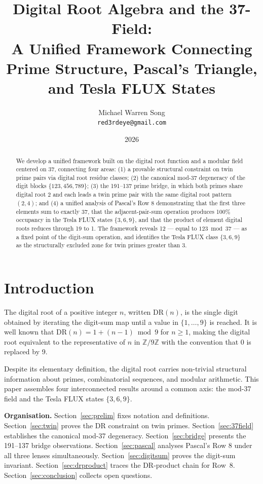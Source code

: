\documentclass[12pt]{article}
\title{Digital Root Algebra and the 37-Field:\\
A Unified Framework Connecting\\
Prime Structure, Pascal's Triangle, and Tesla FLUX States}
\author{Michael Warren Song\\
\small\texttt{red3rdeye@gmail.com}}
\date{2026}
\begin{document}
\maketitle

\begin{abstract}
We develop a unified framework built on the digital root function and a modular
field centered on 37, connecting four areas: (1) a provable structural constraint
on twin prime pairs via digital root residue classes; (2) the canonical mod-37
degeneracy of the digit blocks $\{123, 456, 789\}$; (3) the 191--137 prime bridge,
in which both primes share digital root 2 and each leads a twin prime pair with
the same digital root pattern $(2,4)$; and (4) a unified analysis of Pascal's
Row 8 demonstrating that the first three elements sum to exactly 37, that the
adjacent-pair-sum operation produces 100\% occupancy in the Tesla FLUX states
$\{3,6,9\}$, and that the product of element digital roots reduces through 19
to 1.  The framework reveals 12 --- equal to $123 \bmod 37$ --- as a fixed
point of the digit-sum operation, and identifies the Tesla FLUX class $\{3,6,9\}$
as the structurally excluded zone for twin primes greater than 3.
\end{abstract}

\tableofcontents
\newpage

\section{Introduction}
\label{sec:intro}

The digital root of a positive integer $n$, written $\mathrm{DR}(n)$, is the
single digit obtained by iterating the digit-sum map until a value in $\{1,\ldots,9\}$
is reached.  It is well known that $\mathrm{DR}(n) = 1 + (n-1)\bmod 9$ for
$n \geq 1$, making the digital root equivalent to the representative of $n$ in
$\mathbb{Z}/9\mathbb{Z}$ with the convention that 0 is replaced by 9.

Despite its elementary definition, the digital root carries non-trivial structural
information about primes, combinatorial sequences, and modular arithmetic.  This
paper assembles four interconnected results around a common axis: the mod-37
field and the Tesla FLUX states $\{3,6,9\}$.

\textbf{Organisation.}  Section~\ref{sec:prelim} fixes notation and definitions.
Section~\ref{sec:twin} proves the DR constraint on twin primes.
Section~\ref{sec:37field} establishes the canonical mod-37 degeneracy.
Section~\ref{sec:bridge} presents the 191--137 bridge observations.
Section~\ref{sec:pascal} analyses Pascal's Row 8 under all three lenses
simultaneously.  Section~\ref{sec:digitsum} proves the digit-sum invariant.
Section~\ref{sec:drproduct} traces the DR-product chain for Row~8.
Section~\ref{sec:conclusion} collects open questions.
\end{document}

